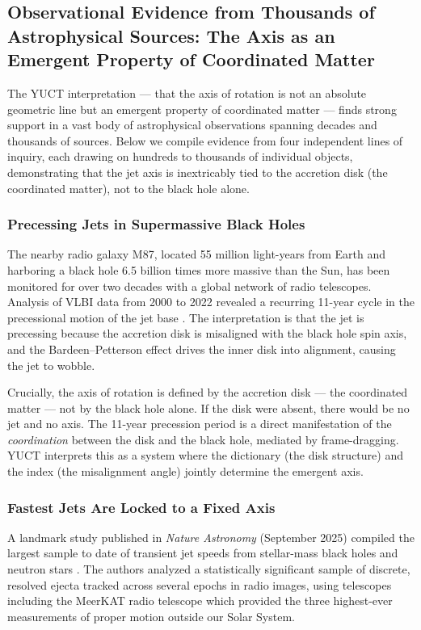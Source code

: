 \documentclass[12pt,a4paper]{article}
\begin{document}
	
	\subsection{Observational Evidence from Thousands of Astrophysical Sources: The Axis as an Emergent Property of Coordinated Matter}
	
	The YUCT interpretation — that the axis of rotation is not an absolute geometric line but an emergent property of coordinated matter — finds strong support in a vast body of astrophysical observations spanning decades and thousands of sources. Below we compile evidence from four independent lines of inquiry, each drawing on hundreds to thousands of individual objects, demonstrating that the jet axis is inextricably tied to the accretion disk (the coordinated matter), not to the black hole alone.
	
	\subsubsection{Precessing Jets in Supermassive Black Holes}
	
	The nearby radio galaxy M87, located 55 million light-years from Earth and harboring a black hole 6.5 billion times more massive than the Sun, has been monitored for over two decades with a global network of radio telescopes. Analysis of VLBI data from 2000 to 2022 revealed a recurring 11-year cycle in the precessional motion of the jet base \cite{M87Precession2024}. The interpretation is that the jet is precessing because the accretion disk is misaligned with the black hole spin axis, and the Bardeen–Petterson effect drives the inner disk into alignment, causing the jet to wobble.
	
	Crucially, the axis of rotation is defined by the accretion disk — the coordinated matter — not by the black hole alone. If the disk were absent, there would be no jet and no axis. The 11-year precession period is a direct manifestation of the \emph{coordination} between the disk and the black hole, mediated by frame-dragging. YUCT interprets this as a system where the dictionary (the disk structure) and the index (the misalignment angle) jointly determine the emergent axis.
	
	\subsubsection{Fastest Jets Are Locked to a Fixed Axis}
	
	A landmark study published in \emph{Nature Astronomy} (September 2025) compiled the largest sample to date of transient jet speeds from stellar-mass black holes and neutron stars \cite{NatureAstronomy2025}. The authors analyzed a statistically significant sample of discrete, resolved ejecta tracked across several epochs in radio images, using telescopes including the MeerKAT radio telescope which provided the three highest-ever measurements of proper motion outside our Solar System.
	
\end{document}
